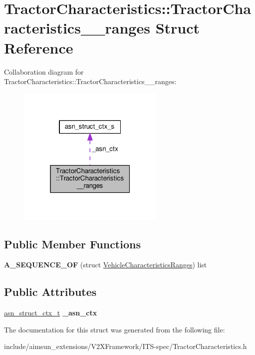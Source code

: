 \hypertarget{structTractorCharacteristics_1_1TractorCharacteristics____ranges}{}\section{Tractor\+Characteristics\+:\+:Tractor\+Characteristics\+\_\+\+\_\+ranges Struct Reference}
\label{structTractorCharacteristics_1_1TractorCharacteristics____ranges}


Collaboration diagram for Tractor\+Characteristics\+:\+:Tractor\+Characteristics\+\_\+\+\_\+ranges\+:\nopagebreak
\begin{figure}[H]
\begin{center}
\leavevmode
\includegraphics[width=199pt]{structTractorCharacteristics_1_1TractorCharacteristics____ranges__coll__graph}
\end{center}
\end{figure}
\subsection*{Public Member Functions}
\begin{DoxyCompactItemize}
\item 
{\bfseries A\+\_\+\+S\+E\+Q\+U\+E\+N\+C\+E\+\_\+\+OF} (struct \hyperlink{structVehicleCharacteristicsRanges}{Vehicle\+Characteristics\+Ranges}) list\hypertarget{structTractorCharacteristics_1_1TractorCharacteristics____ranges_a15602064cf771f97de1aadf6b115749a}{}\label{structTractorCharacteristics_1_1TractorCharacteristics____ranges_a15602064cf771f97de1aadf6b115749a}

\end{DoxyCompactItemize}
\subsection*{Public Attributes}
\begin{DoxyCompactItemize}
\item 
\hyperlink{structasn__struct__ctx__s}{asn\+\_\+struct\+\_\+ctx\+\_\+t} {\bfseries \+\_\+asn\+\_\+ctx}\hypertarget{structTractorCharacteristics_1_1TractorCharacteristics____ranges_a152893b3c0d5d2f8e95a64b947c0a5b4}{}\label{structTractorCharacteristics_1_1TractorCharacteristics____ranges_a152893b3c0d5d2f8e95a64b947c0a5b4}

\end{DoxyCompactItemize}


The documentation for this struct was generated from the following file\+:\begin{DoxyCompactItemize}
\item 
include/aimsun\+\_\+extensions/\+V2\+X\+Framework/\+I\+T\+S-\/spec/Tractor\+Characteristics.\+h\end{DoxyCompactItemize}
